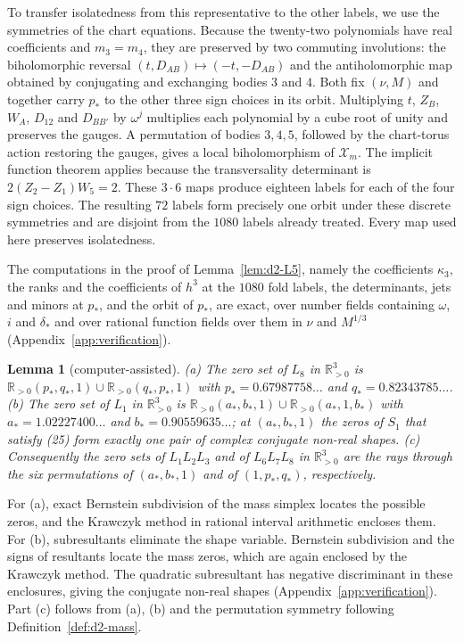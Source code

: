 \documentclass[11pt]{amsart}
\newtheorem{lemma}[theorem]{Lemma}
\theoremstyle{definition}
\theoremstyle{remark}
\newcommand{\Rp}{\mathbb{R}_{>0}}
\begin{document}
{To transfer isolatedness from this representative to the other labels,
we use the symmetries of the chart equations.
Because the twenty-two polynomials have real coefficients and $m_3=m_4$, they are
preserved by two commuting involutions: the biholomorphic reversal
$(t,D_{AB})\mapsto(-t,-D_{AB})$ and the antiholomorphic map obtained by conjugating and
exchanging bodies $3$ and $4$.
Both fix $(\nu,M)$ and together carry $p_*$ to the other three sign choices in its orbit.
Multiplying $t$, $Z_B$, $W_A$, $D_{12}$ and $D_{BB'}$ by $\omega^j$ multiplies each
polynomial by a cube root of unity and preserves the gauges.
A permutation of bodies $3,4,5$, followed by the chart-torus action restoring the
gauges, gives a local biholomorphism of $\mathcal X_m$.
The implicit function theorem applies because the transversality determinant is
$2(Z_2-Z_1)W_5=2$.
These $3\cdot6$ maps produce eighteen labels for each of the four sign choices.
The resulting $72$ labels form precisely one orbit under these discrete symmetries and
are disjoint from the $1080$ labels already treated.
Every map used here preserves isolatedness.}

The computations in the proof of Lemma~\ref{lem:d2-L5}, namely the coefficients $\kappa_3$, the
ranks and the coefficients of $h^3$ at the $1080$ fold labels, the determinants, jets and minors
at $p_*$, and the orbit of $p_*$, are exact, over number fields containing $\omega$, $i$ and
$\delta_*$ and over rational function fields over them in $\nu$ and $M^{1/3}$
(Appendix~\ref{app:verification}).

\begin{lemma}[computer-assisted]\label{lem:d2-rays}
\textup{(a)} The zero set of $L_8$ in $\Rp^3$ is $\Rp(p_*,q_*,1)\cup\Rp(q_*,p_*,1)$ with
$p_*=0.67987758\ldots$ and $q_*=0.82343785\ldots$.
\textup{(b)} The zero set of $L_1$ in $\Rp^3$ is $\Rp(a_*,b_*,1)\cup\Rp(a_*,1,b_*)$ with
$a_*=1.02227400\ldots$ and $b_*=0.90559635\ldots$; at $(a_*,b_*,1)$ the zeros of $S_1$ that
satisfy \textup{(25)} form exactly one pair of complex conjugate non-real shapes.
\textup{(c)} Consequently the zero sets of $L_1L_2L_3$ and of $L_6L_7L_8$ in $\Rp^3$ are the rays
through the six permutations of $(a_*,b_*,1)$ and of $(1,p_*,q_*)$, respectively.
\end{lemma}
{For (a), exact Bernstein subdivision of the mass simplex locates the
possible zeros, and the Krawczyk method in rational interval arithmetic encloses them.
For (b), subresultants eliminate the shape variable.
Bernstein subdivision and the signs of resultants locate the mass zeros, which are
again enclosed by the Krawczyk method.  The quadratic subresultant has negative
discriminant in these enclosures, giving the conjugate non-real shapes
(Appendix~\ref{app:verification}).
Part (c) follows from (a), (b) and the permutation symmetry following
Definition~\ref{def:d2-mass}.}
\end{document}
